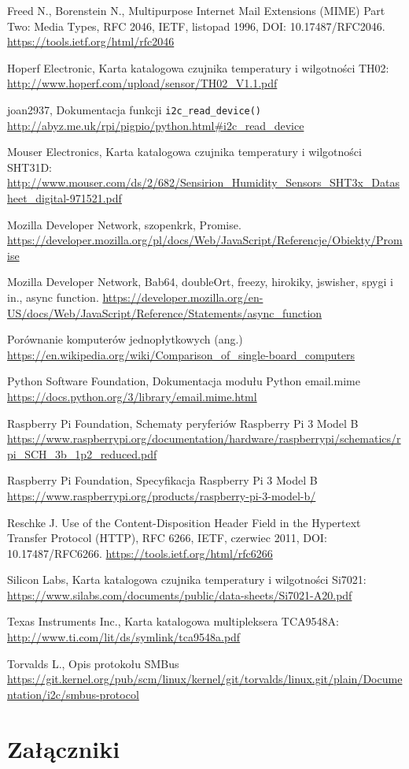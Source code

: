 \documentclass[a4paper,11pt,twoside]{article}
\begin{document}
\begin{thebibliography}{9}
Freed N., Borenstein N., Multipurpose Internet Mail Extensions (MIME) Part Two: Media Types, RFC 2046, IETF, listopad 1996, DOI: 10.17487/RFC2046.
\url{https://tools.ietf.org/html/rfc2046}

Hoperf Electronic, Karta katalogowa czujnika temperatury i wilgotności TH02:
\url{http://www.hoperf.com/upload/sensor/TH02_V1.1.pdf}

joan2937, Dokumentacja funkcji \texttt{i2c{\_}read{\_}device()}
\url{http://abyz.me.uk/rpi/pigpio/python.html#i2c_read_device}

Mouser Electronics, Karta katalogowa czujnika temperatury i wilgotności SHT31D:
\url{http://www.mouser.com/ds/2/682/Sensirion_Humidity_Sensors_SHT3x_Datasheet_digital-971521.pdf}

Mozilla Developer Network, szopenkrk, Promise.
\url{https://developer.mozilla.org/pl/docs/Web/JavaScript/Referencje/Obiekty/Promise}

Mozilla Developer Network, Bab64, doubleOrt, freezy, hirokiky, jswisher, spygi i in., async function.
\url{https://developer.mozilla.org/en-US/docs/Web/JavaScript/Reference/Statements/async_function}

Porównanie komputerów jednopłytkowych (ang.)
\url{https://en.wikipedia.org/wiki/Comparison_of_single-board_computers}

Python Software Foundation, Dokumentacja modułu Python email.mime
\url{https://docs.python.org/3/library/email.mime.html}

Raspberry Pi Foundation, Schematy peryferiów Raspberry Pi 3 Model B
\url{https://www.raspberrypi.org/documentation/hardware/raspberrypi/schematics/rpi_SCH_3b_1p2_reduced.pdf}

Raspberry Pi Foundation, Specyfikacja Raspberry Pi 3 Model B
\url{https://www.raspberrypi.org/products/raspberry-pi-3-model-b/}

Reschke J. Use of the Content-Disposition Header Field in the Hypertext Transfer Protocol (HTTP), RFC 6266, IETF, czerwiec 2011, DOI: 10.17487/RFC6266.
\url{https://tools.ietf.org/html/rfc6266}

Silicon Labs, Karta katalogowa czujnika temperatury i wilgotności Si7021:
\url{https://www.silabs.com/documents/public/data-sheets/Si7021-A20.pdf}

Texas Instruments Inc., Karta katalogowa multipleksera TCA9548A:
\url{http://www.ti.com/lit/ds/symlink/tca9548a.pdf}

Torvalds L., Opis protokołu SMBus
\url{https://git.kernel.org/pub/scm/linux/kernel/git/torvalds/linux.git/plain/Documentation/i2c/smbus-protocol}

\end{thebibliography}

\newpage
\section{Załączniki}
\end{document}
